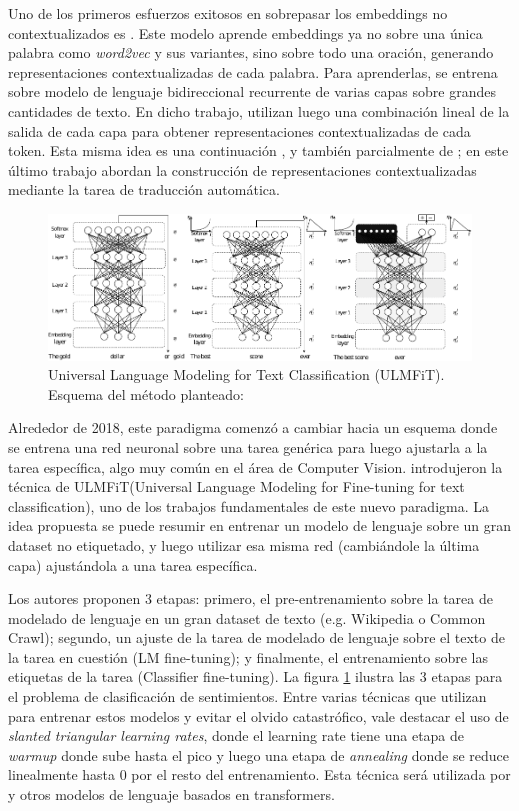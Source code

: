 Uno de los primeros esfuerzos exitosos en sobrepasar los embeddings no contextualizados es \elmo{} \cite{peters2018}. Este modelo aprende embeddings ya no sobre una única palabra como \emph{word2vec} y sus variantes, sino sobre todo una oración, generando representaciones contextualizadas de cada palabra.  Para aprenderlas, \elmo{} se entrena sobre modelo de lenguaje bidireccional recurrente de varias capas sobre grandes cantidades de texto. En dicho trabajo, utilizan luego una combinación lineal de la salida de cada capa para obtener representaciones contextualizadas de cada token. Esta misma idea es una continuación \citet{peters2017semi}, y también parcialmente de \citet{mccann2017learned}; en este último trabajo abordan la construcción de representaciones contextualizadas mediante la tarea de traducción automática.

\begin{figure}[t]
    \centering
    \includegraphics[width=\textwidth]{img/02/ulmfit.pdf}
    \caption{Universal Language Modeling for Text Classification (ULMFiT). Esquema del método planteado:}
    \label{fig:ulmfit}
\end{figure}

Alrededor de 2018, este paradigma comenzó a cambiar hacia un esquema donde se entrena una red neuronal sobre una tarea genérica para luego ajustarla a la tarea específica, algo muy común en el área de Computer Vision. \citet{howard-ruder-2018-universal} introdujeron la técnica de ULMFiT(Universal Language Modeling for Fine-tuning for text classification), uno de los trabajos fundamentales de este nuevo paradigma. La idea propuesta se puede resumir en entrenar un modelo de lenguaje sobre un gran dataset no etiquetado, y luego utilizar esa misma red (cambiándole la última capa) ajustándola a una tarea específica.

Los autores proponen 3 etapas: primero, el pre-entrenamiento sobre la tarea de modelado de lenguaje en un gran dataset de texto (e.g. Wikipedia o Common Crawl); segundo, un ajuste de la tarea de modelado de lenguaje sobre el texto de la tarea en cuestión (LM fine-tuning); y finalmente, el entrenamiento sobre las etiquetas de la tarea (Classifier fine-tuning). La figura \ref{fig:ulmfit} ilustra las 3 etapas para el problema de clasificación de sentimientos. Entre varias técnicas que utilizan para entrenar estos modelos y evitar el olvido catastrófico, vale destacar el uso de \emph{slanted triangular learning rates}, donde el learning rate tiene una etapa de \emph{warmup} donde sube hasta el pico y luego una etapa de \emph{annealing} donde se reduce linealmente hasta 0 por el resto del entrenamiento. Esta técnica será utilizada por \bert{} y otros modelos de lenguaje basados en transformers.

